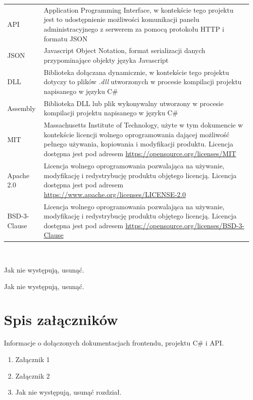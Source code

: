 \documentclass[a4paper,11pt,twoside]{report}
\theoremstyle{definition}
\begin{document}
\begin{tabular}{p{} p{}}
    API 
    & Application Programming Interface, w kontekście tego projektu jest to udostępnienie możliwości komunikacji panelu administracyjnego z serwerem za pomocą protokołu HTTP i formatu JSON \\
    JSON
    & Javascript Object Notation, format serializacji danych przypominające objekty języka Javascript \\
    DLL
    & Biblioteka dołączana dynamicznie, w kontekście tego projektu dotyczy to plików \textit{.dll} utworzonych w procesie kompilacji projektu napisanego w języku C\# \\
    Assembly
    & Biblioteka DLL lub plik wykonywalny utworzony w procesie kompilacji projektu napisanego w języku C\# \\
    MIT
    & Massachusetts Institute of Technology, użyte w tym dokumencie w kontekście licencji wolnego oprogramowania dającej możliwość pełnego używania, kopiowania i modyfikacji produktu. Licencja dostępna jest pod adresem \newline
    \url{https://opensource.org/licenses/MIT} \\
    Apache 2.0
    & Licencja wolnego oprogramowania pozwalająca na używanie, modyfikację i redystrybucję produktu objętego licencją. Licencja dostępna jest pod adresem \newline
    \url{https://www.apache.org/licenses/LICENSE-2.0} \\
    BSD-3-Clause
    & Licencja wolnego oprogramowania pozwalająca na używanie, modyfikację i redystrybucję produktu objętego licencją. Licencja dostępna jest pod adresem \newline
    \url{https://opensource.org/licenses/BSD-3-Clause}
\end{tabular}
\\
\thispagestyle{empty}


\listoffigures
\thispagestyle{empty}
Jak nie występują, usunąć.


\renewcommand{\listtablename}{Spis tabel}
\listoftables
\thispagestyle{empty}
Jak nie występują, usunąć.



\chapter*{Spis załączników}

Informacje o dołączonych dokumentacjach frontendu, projektu C\# i API.

\begin{enumerate}
\item Załącznik 1
\item Załącznik 2
\item Jak nie występują, usunąć rozdział.
\end{enumerate}
\thispagestyle{empty}
\end{document}
